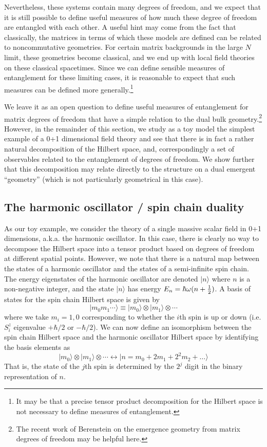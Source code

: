 \documentclass[12pt,epsf]{article}
\renewcommand{\(}{\left(}
\renewcommand{\)}{\right)}
\begin{document}
Nevertheless, these systems contain many degrees of freedom, and we expect that it is still possible to define useful measures of how much these degree of freedom are entangled with each other. A useful hint may come from the fact that classically, the matrices in terms of which these models are defined can be related to noncommutative geometries. For certain matrix backgrounds in the large $N$ limit, these geometries become classical, and we end up with local field theories on these classical spacetimes. Since we can define sensible measures of entanglement for these limiting cases, it is reasonable to expect that such measures can be defined more generally.\footnote{It may be that a precise tensor product decomposition for the Hilbert space is not necessary to define measures of entanglement.}

We leave it as an open question to define useful measures of entanglement for matrix degrees of freedom that have a simple relation to the dual bulk geometry.\footnote{The recent work of Berenstein \cite{berenstein} on the emergence geometry from matrix degrees of freedom may be helpful here.} However, in the remainder of this section, we study as a toy model the simplest example of a 0+1 dimensional field theory and see that there is in fact a rather natural decomposition of the Hilbert space, and, correspondingly a set of observables related to the entanglement of degrees of freedom. We show further that this decomposition may relate directly to the structure on a dual emergent ``geometry'' (which is not particularly geometrical in this case).

\subsection{The harmonic oscillator / spin chain duality}

As our toy example, we consider the theory of a single massive scalar field in 0+1 dimensions, a.k.a. the harmonic oscillator. In this case, there is clearly no way to decompose the Hilbert space into a tensor product based on degrees of freedom at different spatial points. However, we note that there is a natural map between the states of a harmonic oscillator and the states of a semi-infinite spin chain. The energy eigenstates of the harmonic oscillator are denoted $|n \rangle$ where $n$ is a non-negative integer, and the state $|n \rangle$ has energy $E_n = \hbar \omega (n + {1 \over 2})$. A basis of states for the spin chain Hilbert space is given by
$$
|m_0 m_1 \cdots \rangle \equiv |m_0 \rangle \otimes |m_1 \rangle \otimes \cdots
$$
where we take $m_i = 1,0$ corresponding to whether the $i$th spin is up or down (i.e. $S^z_i$ eigenvalue $+\hbar/2$ or $-\hbar/2$). We can now define an isomorphism between the spin chain Hilbert space and the harmonic oscillator Hilbert space by identifying the basis elements as
\[
|m_0 \rangle \otimes |m_1 \rangle \otimes \cdots \leftrightarrow |n= m_0 + 2 m_1 + 2^2 m_2 + \dots \rangle
\]
That is, the state of the $j$th spin is determined by the $2^j$ digit in the binary representation of $n$.
\end{document}
